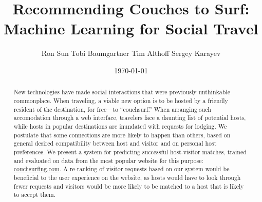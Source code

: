 \documentclass{article}
\title{Recommending Couches to Surf: Machine Learning for Social Travel}
\author{Ron Sun \And Tobi Baumgartner \And Tim Althoff \And Sergey Karayev}
\date{\today}
\begin{document}
\maketitle

\begin{abstract}
New technologies have made social interactions that were previously unthinkable commonplace.
When traveling, a viable new option is to be hosted by a friendly resident of the destination, for free---to ``couchsurf.''
When arranging such accomodation through a web interface, travelers face a daunting list of potential hosts, while hosts in popular destinations are inundated with requests for lodging.
We postulate that some connections are more likely to happen than others, based on general desired compatibility between host and visitor and on personal host preferences.
We present a system for predicting successful host-visitor matches, trained and evaluated on data from the most popular website for this purpose: \url{couchsurfing.com}.
A re-ranking of visitor requests based on our system would be beneficial to the user experience on the website, as hosts would have to look through fewer requests and visitors would be more likely to be matched to a host that is likely to accept them.
\end{abstract}








\small

\end{document}
